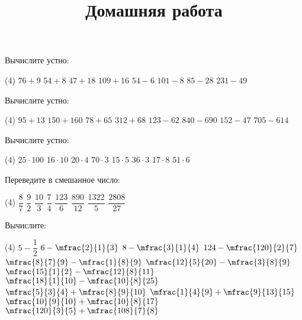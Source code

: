 %

\begin{class}[number=1]
	\begin{listofex}
		\item Вычислите устно:
		\begin{tasks}(4)
			\task \( 76+9 \)
			\task \( 54+8 \)
			\task \( 47+18 \)
			\task \( 109+16 \)
			\task \( 54-6 \)
			\task \( 101-8 \)
			\task \( 85-28 \)
			\task \( 231-49 \)
		\end{tasks}
		\item Вычислите устно:
		\begin{tasks}(4)
			\task \( 95+13 \)
			\task \( 150+160 \)
			\task \( 78+65 \)
			\task \( 312+68 \)
			\task \( 123-62 \)
			\task \( 840-690 \)
			\task \( 152-47 \)
			\task \( 705-614 \)
		\end{tasks}
		\item Вычислите устно:
		\begin{tasks}(4)
			\task \( 25\cdot100 \)
			\task \( 16\cdot10 \)
			\task \( 20\cdot4 \)
			\task \( 70\cdot3 \)
			\task \( 15\cdot5 \)
			\task \( 36\cdot3 \)
			\task \( 17\cdot8 \)
			\task \( 51\cdot6 \)
		\end{tasks}
		\item Переведите в смешанное число:
		\begin{tasks}(4)
			\task \( \dfrac{8}{7} \)
			\task \( \dfrac{9}{2} \)
			\task \( \dfrac{10}{3} \)
			\task \( \dfrac{7}{4} \)
			\task \( \dfrac{123}{6} \)
			\task \( \dfrac{890}{12} \)
			\task \( \dfrac{1322}{5} \)
			\task \( \dfrac{2808}{27} \)
		\end{tasks}
		\item Вычислите:
		\begin{tasks}(4)
			\task \( 5-\dfrac{1}{2} \)
			\task \( 6-\mfrac{2}{1}{3} \)
			\task \( 8-\mfrac{3}{1}{4} \)
			\task \( 124-\mfrac{120}{2}{7} \)
			\task \( \mfrac{8}{7}{9}-\mfrac{1}{8}{9} \)
			\task \( \mfrac{12}{5}{20}-\mfrac{3}{8}{9} \)
			\task \( \mfrac{15}{1}{2}-\mfrac{12}{8}{11} \)
			\task \( \mfrac{18}{1}{10}-\mfrac{10}{8}{25} \)
			\task \( \mfrac{5}{3}{4}+\mfrac{8}{9}{10} \)
			\task \( \mfrac{1}{4}{9}+\mfrac{9}{13}{15} \)
			\task \( \mfrac{10}{9}{10}+\mfrac{10}{8}{17} \)
			\task \( \mfrac{120}{3}{5}+\mfrac{108}{7}{8} \)
		\end{tasks}
	\end{listofex}
	\newpage
	\title{Домашняя работа}
	\begin{listofex}

\end{listofex}
\end{class}
